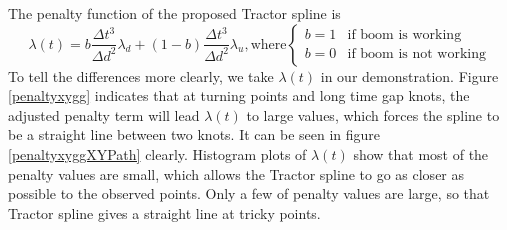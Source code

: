 The penalty function of the proposed Tractor spline is
\begin{equation}\label{penaltylamb}
\lambda(t)=b\frac{\Delta t^3}{\Delta d^2}\lambda_d+(1-b)\frac{\Delta t^3}{\Delta d^2}\lambda_u, \mbox{where}
\begin{cases}
b=1 & \mbox{if boom is working}\\
b=0 & \mbox{if boom is not working}
\end{cases}
\end{equation}
To tell the differences more clearly, we take $\lambda(t)$ in our demonstration. Figure \ref{penaltyxygg} indicates that at turning points and long time gap knots, the adjusted penalty term will lead $\lambda(t)$ to large values, which forces the spline to be a straight line between two knots. It can be seen in figure \ref{penaltyxyggXYPath} clearly. Histogram plots of $\lambda(t)$ show that most of the penalty values are small, which allows the Tractor spline to go as closer as possible to the observed points. Only a few of penalty values are large, so that Tractor spline gives a straight line at tricky points. 


